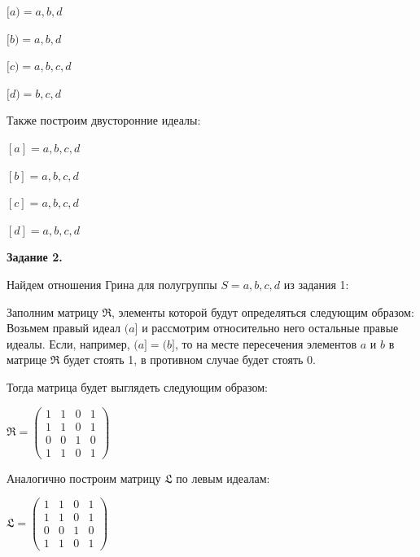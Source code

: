 \documentclass[bachelor, och, labwork]{shiza}
\begin{document}
\begin{enumerate}
\begin{center}
        $[a) = {a, b, d}$

        $[b) = {a, b, d}$

        $[c) = {a, b, c, d}$

        $[d) = {b, c, d}$
      \end{center}

      Также построим двусторонние идеалы:

      \begin{center}
      
        $[a] = {a, b, c, d}$

        $[b] = {a, b, c, d}$

        $[c] = {a, b, c, d}$

        $[d] = {a, b, c, d}$
        
      \end{center}


    \end{enumerate}
    
    
    \textbf{Задание 2.}
    
    Найдем отношения Грина для полугруппы $S = {a, b, c, d}$ из задания 1:

    Заполним матрицу $\mathfrak{R}$, элементы которой будут определяться следующим образом: Возьмем правый идеал $(a]$ и рассмотрим относительно
    него остальные правые идеалы. Если, например, $(a] = (b]$, то на месте пересечения элементов $a$ и $b$ в матрице $\mathfrak{R}$ будет стоять 1,
    в противном случае будет стоять 0.

    Тогда матрица будет выглядеть следующим образом:

    \begin{center}
      $\mathfrak{R} =
      \begin{pmatrix}
        1 & 1 & 0 & 1 \\
        1 & 1 & 0 & 1 \\
        0 & 0 & 1 & 0 \\
        1 & 1 & 0 & 1
      \end{pmatrix}$
    \end{center}
    
    Аналогично построим матрицу $\mathfrak{L}$ по левым идеалам:

    \begin{center}
      $\mathfrak{L} =
      \begin{pmatrix}
        1 & 1 & 0 & 1 \\
        1 & 1 & 0 & 1 \\
        0 & 0 & 1 & 0 \\
        1 & 1 & 0 & 1
      \end{pmatrix}$
    \end{center}
    
\end{document}
